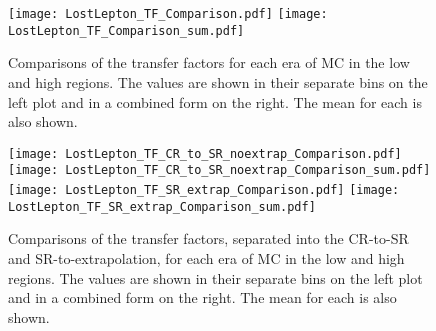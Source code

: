 \begin{figure}[!htb]
	\begin{center}
  \texttt{[image: LostLepton\_TF\_Comparison.pdf]}
  \texttt{[image: LostLepton\_TF\_Comparison\_sum.pdf]} \\
	\end{center}
	\caption{Comparisons of the transfer factors for each era of MC in the low and high \dm{} regions. The values are shown in their separate bins on the left plot and in a combined form on the right. The mean for each is also shown. 
	 }
	\label{fig:llb-1lcr-datavsmc-total-tf}
\end{figure}
\begin{figure}[!htb]
	\begin{center}  
		\texttt{[image: LostLepton\_TF\_CR\_to\_SR\_noextrap\_Comparison.pdf]}
		\texttt{[image: LostLepton\_TF\_CR\_to\_SR\_noextrap\_Comparison\_sum.pdf]} \\
		\texttt{[image: LostLepton\_TF\_SR\_extrap\_Comparison.pdf]}
		\texttt{[image: LostLepton\_TF\_SR\_extrap\_Comparison\_sum.pdf]}
	\end{center}
	\caption{Comparisons of the transfer factors, separated into the CR-to-SR and SR-to-extrapolation, for each era of MC in the low and high \dm{} regions. The values are shown in their separate bins on the left plot and in a combined form on the right. The mean for each is also shown. 
	 }
	\label{fig:llb-1lcr-datavsmc-sep-tf}
\end{figure}
